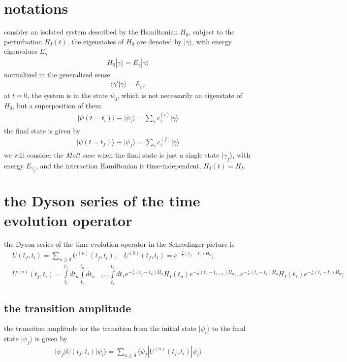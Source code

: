 
\newpage
\section{notations}

consider an isolated system described by the Hamiltonian $H_0$, subject to the perturbation $H_I(t)$.
the eigenstates of $H_0$ are denoted by $|\gamma\rangle$, with energy eigenvalues $E_\gamma$
\begin{align}
  H_0 |\gamma\rangle = E_\gamma|\gamma\rangle
\end{align}
normalized in the generalized sense
\begin{align}
  \langle \gamma'|\gamma\rangle=\delta_{\gamma\gamma'}
\end{align}
at $t = 0$, the system is in the state $\psi_0$, which is not necessarily an eigenstate of $H_0$, but a superposition of them.
\begin{align}
  |\psi(t=t_i)\rangle \equiv |\psi_i\rangle= \sum_\gamma c^{(i)}_\gamma|\gamma\rangle
\end{align}
the final state is given by
\begin{align}
  |\psi(t=t_f)\rangle \equiv |\psi_f\rangle =  \sum_\gamma c^{(f)}_\gamma|\gamma\rangle
\end{align}
we will consider the  {\it Mott case} when the final state is just a single state $|\gamma_f\rangle$, with energy $E_{\gamma_f}$, and the interaction Hamiltonian is time-independent, $H_I(t) = H_I$.
\newpage
\section{the Dyson series of the time evolution operator}
the Dyson series of the time evolution operator in the Schrodinger picture is
\begin{align}
  & U(t_f,t_i) = \sum\limits_{n\ge0}U^{(n)}(t_f,t_i); \quad
  U^{(0)}(t_f,t_i) = e^{-\frac{i}{\hbar}(t_f-t_i)H_0};\nonumber                                                                                                                                                                                                                          \\
  & U^{(n)}(t_f,t_i)=\int\limits_{t_i}^{t_f}dt_n \int\limits_{t_i}^{t_{n}}dt_{n-1} \dots \int\limits_{t_i}^{t_{2}}dt_1 e^{-\frac{i}{\hbar}(t_f-t_n)H_0} H_I(t_n)e^{-\frac{i}{\hbar}(t_{n}-t_{n-1})H_0} \ldots e^{-\frac{i}{\hbar}(t_2-t_1)H_0}H_I(t_1)e^{-\frac{i}{\hbar}(t_1-t_i)H_0};
\end{align}
\subsection{the transition amplitude}
the transition amplitude for the transition from the initial state $|\psi_i\rangle$ to the final state $|\psi_f\rangle$ is given by
\begin{align}
  \langle \psi_f | U(t_f,t_i) | \psi_i \rangle = \sum\limits_{n\ge0}\langle \psi_f | U^{(n)}(t_f,t_i) | \psi_i \rangle
\end{align}
\newpage
